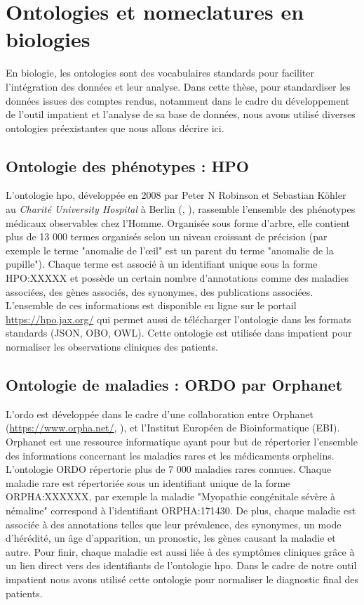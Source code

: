 \section{Ontologies et nomeclatures en biologies}
En biologie, les ontologies sont des vocabulaires standards pour faciliter l'intégration des données et leur analyse. Dans cette thèse, pour standardiser les données issues des comptes rendus, notamment dans le cadre du développement de l'outil \gls{impatient} et l'analyse de sa base de données, nous avons utilisé diverses ontologies préexistantes que nous allons décrire ici.

\subsection{Ontologie des phénotypes : HPO}
L'ontologie \gls{hpo}, développée en 2008 par Peter N Robinson et Sebastian Köhler au \textit{Charité University Hospital} à Berlin (\cite{robinson_human_2008}, \cite{kohler_human_2021}), rassemble l'ensemble des phénotypes médicaux observables chez l'Homme. Organisée sous forme d'arbre, elle contient plus de 13 000 termes organisés selon un niveau croissant de précision (par exemple le terme "anomalie de l'œil" est un parent du terme "anomalie de la pupille"). Chaque terme est associé à un identifiant unique sous la forme HPO:XXXXX et possède un certain nombre d’annotations comme des maladies associées, des gènes associés, des synonymes, des publications associées. L'ensemble de ces informations est disponible en ligne sur le portail  \url{https://hpo.jax.org/} qui permet aussi de télécharger l'ontologie dans les formats standards (JSON, OBO, OWL). Cette ontologie est utilisée dans \gls{impatient} pour normaliser les observations cliniques des patients.

\subsection{Ontologie de maladies : ORDO par Orphanet}
L'\gls{ordo} est développée dans le cadre d'une collaboration entre Orphanet (\url{https://www.orpha.net/}, \cite{maiella_orphanet_2013}), et l'Institut Européen de Bioinformatique (EBI). Orphanet est une ressource informatique ayant pour but de répertorier l'ensemble des informations concernant les maladies rares et les médicaments orphelins. L'ontologie ORDO répertorie plus de 7 000 maladies rares connues. Chaque maladie rare est répertoriée sous un identifiant unique de la forme ORPHA:XXXXXX, par exemple la maladie "Myopathie congénitale sévère à némaline" correspond à l'identifiant ORPHA:171430. De plus, chaque maladie est associée à des annotations telles que leur prévalence, des synonymes, un mode d'hérédité, un âge d'apparition, un pronostic, les gènes causant la maladie et autre. Pour finir, chaque maladie est aussi liée à des symptômes cliniques grâce à un lien direct vers des identifiants de l'ontologie \gls{hpo}. Dans le cadre de notre outil \gls{impatient} nous avons utilisé cette ontologie pour normaliser le diagnostic final des patients.

